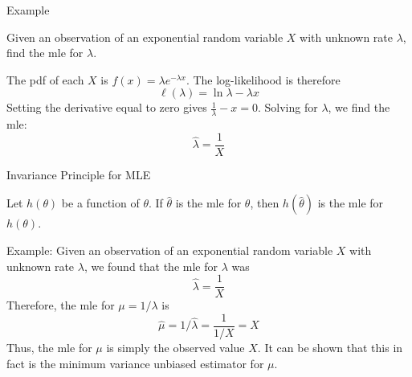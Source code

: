 \documentclass{beamer}
\begin{document}

\begin{frame}{Example}
\begin{block}{}
Given an observation of an exponential random variable $X$ with unknown rate $\lambda$, find the mle for $\lambda$.
\end{block}
\pause
The pdf of each $X$ is $f(x)=\lambda e^{-\lambda x}$. 
\pause The log-likelihood is therefore
$$\ell(\lambda) = \ln\lambda-\lambda x$$
\pause Setting the derivative equal to zero gives $\frac 1\lambda-x=0$. \pause Solving for $\lambda$, we find the mle: $$\hat\lambda = \frac 1X$$
\end{frame}

\begin{frame}{Invariance Principle for MLE}
\begin{block}{}
Let $h(\theta)$ be a function of $\theta$. If $\hat\theta$ is the mle for $\theta$, then $h(\hat\theta)$ is the mle for $h(\theta)$.
\end{block}
%
\pause Example: Given an observation of an exponential random variable $X$ with unknown rate $\lambda$, we found that the mle for $\lambda$ was $$\hat\lambda = \frac1X$$
Therefore, the mle for $\mu=1/\lambda$ is $$\hat\mu = 1/\hat\lambda = \frac1{1/X}=X$$
Thus, the mle for $\mu$ is simply the observed value $X$. It can be shown that this in fact is the minimum variance unbiased estimator for $\mu$.
\end{frame}
\end{document}
